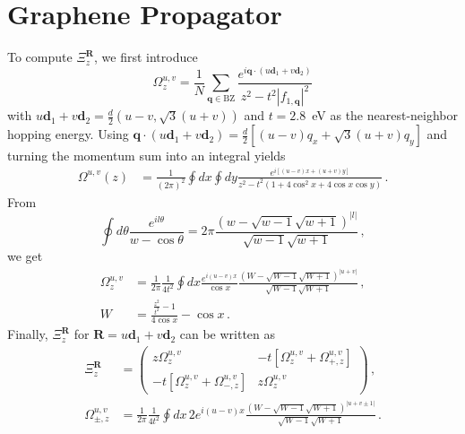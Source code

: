 \documentclass[aps,prb,superscriptaddress,preprint,floatfix]{revtex4-1}
\begin{document}
\section{Graphene Propagator}
\label{sec:Propagator}

To compute $\Xi_z^\mathbf{R}$, we first introduce
%
\begin{equation}
	\Omega^{u,v}_z =
	\frac{1}{N}\sum_{\mathbf{q}\in\mathrm{BZ}}
	\frac{
		e^{i\mathbf{q}\cdot \left(u\mathbf{d}_1 + v\mathbf{d}_2\right)}
	}
	{z^2 - t^2\left| f_{1,\mathbf{q}}\right|^2}
	\label{eqn:Omega_R}
\end{equation}
%
with $ u\mathbf{d}_1 + v\mathbf{d}_2 = \frac{d}{2}\left(u - v, \sqrt{3}\left(u+v\right)\right)$ and $t = 2.8$~eV as the nearest-neighbor hopping energy. Using $\mathbf{q}\cdot \left(u\mathbf{d}_1 + v\mathbf{d}_2\right)  = \frac{d}{2}\left[\left(u - v\right)q_x + \sqrt{3}\left(u+v\right)q_y\right]$ and turning the momentum sum into an integral yields
%
\begin{align}
	\Omega^{u,v}\left(z\right) 
	& = \frac{1}{\left(2\pi\right)^2}\oint dx \oint dy
	\frac
	{e^{i \left[\left(u - v\right)x + \left(u+v\right)y\right]}}
	{z^2 - t^2\left(1 + 4\cos^2 x + 4 \cos x\cos y \right)}\,.
	\label{eqn:Omega_R_2}
\end{align}
%
From
%
\begin{equation}
	\oint d\theta \frac{e^{il\theta}}{w-\cos\theta} = 2\pi \frac{\left(w - \sqrt{w - 1}\sqrt{w + 1}\right)^{|l|}}{\sqrt{w - 1}\sqrt{w + 1}}\,,
	\label{eqn:Ang_Int}
\end{equation}
%
we get
%
\begin{align}
	\Omega^{u,v}_z &= \frac{1}{2\pi}\frac{1}{4t^2}
	\oint dx \frac{e^{i\left(u - v\right)x}}{\cos x}\frac{\left(W - \sqrt{W - 1}\sqrt{W + 1}\right)^{|u+v|}}{\sqrt{W - 1}\sqrt{W + 1}}\,,
	\label{eqn:Omega_R_3}
	\\
	W &= \frac{\frac{z^2}{t^2}-1}{4\cos x}-\cos x\,.
	\label{eqn:W}
\end{align}
%
Finally, $\Xi^{\mathbf{R}}_z$ for $\mathbf{R} = u\mathbf{d}_1 + v\mathbf{d}_2$ can be written as
%
\begin{align}
	\Xi^{\mathbf{R}}_z 
	&=
	\begin{pmatrix}
		z\Omega^{u,v}_z
		&
		- t\left[\Omega^{u,v}_z + \Omega^{u,v}_{+,z} \right]
		\\
		- t\left[\Omega^{u,v}_z + \Omega^{u,v}_{-,z}\right]
		&
		z\Omega^{u,v}_z
	\end{pmatrix}\,,
	\\
	\Omega^{u,v}_{\pm,z}
	&= 
	 \frac{1}{2\pi}\frac{1}{4t^2}
	\oint dx \,2e^{i\left(u - v\right)x}\frac{\left(W - \sqrt{W - 1}\sqrt{W + 1}\right)^{|u+v\pm 1|}}{\sqrt{W - 1}\sqrt{W + 1}}
\,.
\end{align}
%
\end{document}
